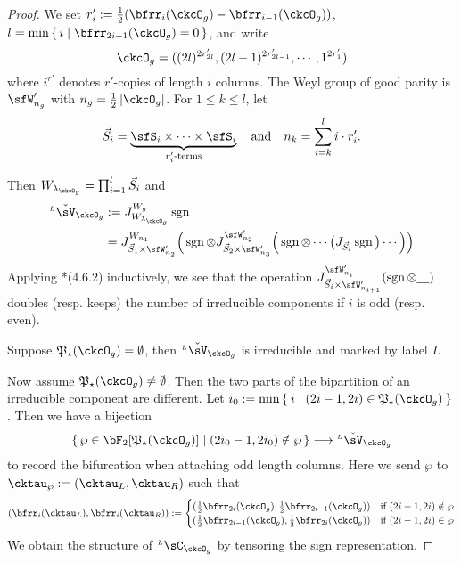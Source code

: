 \documentclass[12pt,a4paper]{amsart}
\def\abs#1{\left|{#1}\right|}
\newcommand{\sgn}{\operatorname{sgn}}
\numberwithin{equation}{section}
\theoremstyle{remark}
\def\half{{\tfrac{1}{2}}}
\def\lamckg{\lambda_{\ckcO_g}}
\def\LC{{}^{\scriptscriptstyle L}\sC}
\def\ckLV{{}^{\scriptscriptstyle L}\check\sV}
\def\AND{\quad \text{and} \quad}
\def\CPPs{\mathfrak{P}_{\star}}
\def\sP{\wp}
\begin{document}
\begin{proof}
 We set $r'_{i} := \half(\bfrr_{i}(\ckcO_{g})-\bfrr_{i-1}(\ckcO_{g}))$,
 $l =\min\set{i|\bfrr_{2i+1}(\ckcO_{g})=0}$,
 and write
  \[
    \ckcO_{g} %
    = ((2l)^{2r'_{2l}}, (2l-1)^{2r'_{2l-1}},\cdots, 1^{2r'_{1}})
  \]
  where $i^{r'}$ denotes $r'$-copies of length $i$ columns.
 The Weyl group of good parity is $\sfW'_{n_{g}}$ with
 $n_{g} = \half\abs{\ckcO_{g}}$.
 For $1\leq k\leq l$, let
  \[
    \vec{S}_{i}  =
     \underbrace{\sfS_{i}\times \cdots\times \sfS_{i}}_{r'_{i}\text{-terms}}
     \AND
     n_{k}  = \sum_{i=k}^{l} i\cdot r'_{i}.
\]

Then $W_{\lamckg}=\prod_{i=1}^{l} \vec{S}_{i}$ and
\[
    \begin{split}
      \ckLV_{\ckcO_{g}}& :=J_{W_{\lamckg}}^{\Wg}\sgn\\
      & =  J_{\vec{S}_{1}\times \sfW'_{n_{2}}}^{W_{n_{1}}}
      \Big(\sgn \otimes
      J_{\vec{S}_{2}\times \sfW'_{n_{3}}}^{\sfW'_{n_{2}}}\Big(\sgn
      \otimes \cdots\big(J_{\vec{S}_{l}} \sgn\big)\cdots \Big)\Big) \\
    \end{split}
  \]
  Applying \cite{Lu}*{(4.6.2)} inductively, we see that the operation
  $J_{\vec{S}_{i}\times \sfW'_{n_{i+1}}}^{\sfW'_{n_{i}}}(\sgn \otimes \underline{\ \ \ })$
  doubles (resp. keeps) the number of irreducible components if $i$ is odd
  (resp. even).

  Suppose $\CPPs(\ckcO_{g}) = \emptyset$, then $\ckLV_{\ckcO_{g}}$
  is irreducible and marked by label $I$.

  Now assume $\CPPs(\ckcO_{g})\neq \emptyset$.
  Then the two parts of the bipartition of an irreducible
  component are different.
  Let $i_{0}:= \min\Set{i| (2i-1,2i)\in \CPPs(\ckcO_{g})}$.
  Then we have a bijection
  \[
    \set{\sP\in \bF_{2}[\CPPs(\ckcO_{g})]|(2i_{0}-1,2i_{0})\notin \sP}  \longrightarrow  \ckLV_{\ckcO_{g}}
  \]
  to record the bifurcation when attaching odd length columns.
  Here we send
  $\sP$ to $\cktau_{\sP}:= (\cktau_{L},\cktau_{R})$ such that
  \[
    (\bfrr_{i}(\cktau_{L}),\bfrr_{i}(\cktau_{R}))
    := \begin{cases}
      (\half\bfrr_{2i}(\ckcO_{g}),\half\bfrr_{2i-1}(\ckcO_{g}))
      & \text{if } (2i-1,2i)\notin \sP\\
      (\half\bfrr_{2i-1}(\ckcO_{g}),\half\bfrr_{2i}(\ckcO_{g}))
      & \text{if } (2i-1,2i)\in \sP\\
    \end{cases}
  \]
  We obtain the structure of $\LC_{\ckcO_{g}}$ by tensoring the sign
  representation.


\end{proof}
\end{document}
